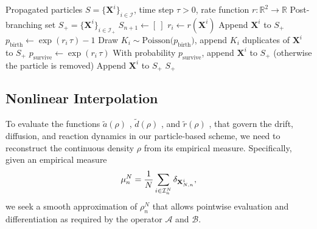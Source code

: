\documentclass[preprint,12pt]{elsarticle}
\theoremstyle{definition}
\theoremstyle{remark}
\begin{document}
\begin{algorithm}
\caption{Birth--Death Step}\label{alg:birthdeath}
\begin{algorithmic}
\Require Propagated particles $S=\{\mathbf X^{i}\}_{i\in\mathcal I}$, time step $\tau>0$, rate function $r:\mathbb R^2\to\mathbb R$
\Ensure Post-branching set $S_{+}=\{\mathbf X^{i}\}_{i\in\mathcal I_{+}}$
    \State $S_{n+1}\gets [\ ]$
        \State $r_i \gets r(\mathbf X^{i})$
         
            \State Append $\mathbf X^{i}$ to $S_{+}$ 
            \State $p_{\mathrm{birth}} \gets \exp(r_i\,\tau) - 1$
            \State Draw $K_i \sim \mathrm{Poisson}\!\big(p_{\mathrm{birth}}\big)$, append $K_i$ duplicates of $\mathbf X^{i}$ to $S_{+}$
         
            \State $p_{\mathrm{survive}}\gets \exp(r_i\,\tau)$ 
            \State With probability $p_{\mathrm{survive}}$, append $\mathbf X^{i}$ to $S_{+}$
            \State \quad (otherwise the particle is removed)
        \Else {}
            \State Append $\mathbf X^{i}$ to $S_{+}$
        \EndIf
    \EndFor
    \State \Return $S_{+}$
\EndProcedure
\end{algorithmic}
\end{algorithm}


\subsection{Nonlinear Interpolation}
\label{sec:interpolation}
To evaluate the functions $\tilde a(\rho)$ ,  $\tilde d(\rho)$ , and $\tilde r(\rho)$ , that govern the drift, diffusion, and reaction dynamics in our particle-based scheme, we need to reconstruct the continuous density 
$\rho$ from its empirical measure. Specifically, given an empirical measure
\[
\mu^N_n= \frac{1}{N}\sum_{i\in \mathcal I^N_n}\delta_{\mathbf{X}_{N,n}^i},
\] 
we seek a smooth approximation of $\rho^N_n$ that allows pointwise evaluation and differentiation as required by the operator $\mathcal{A}$ and $\mathcal{B}$.
\end{document}
